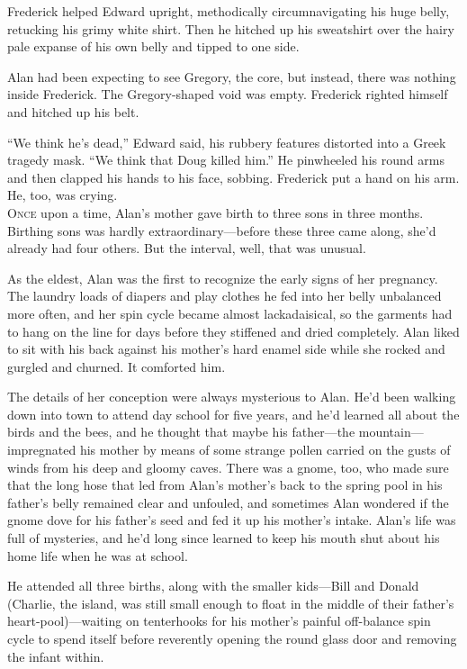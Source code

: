 \documentclass{article}
\begin{document}
Frederick helped Edward upright, methodically circumnavigating his
huge belly, retucking his grimy white shirt.  Then he hitched up his
sweatshirt over the hairy pale expanse of his own belly and tipped to
one side.

Alan had been expecting to see Gregory, the core, but instead, there
was nothing inside Frederick.  The Gregory-shaped void was empty. 
Frederick righted himself and hitched up his belt.

``We think he's dead,'' Edward said, his rubbery features distorted
into a Greek tragedy mask.  ``We think that Doug killed him.'' He
pinwheeled his round arms and then clapped his hands to his face,
sobbing.  Frederick put a hand on his arm.  He, too, was crying.
\\
\lettrine[lines=3, lhang=.5, nindent=0pt, findent=2pt]{O}{nce} upon a time, Alan's mother gave birth to three sons in three
months.  Birthing sons was hardly extraordinary---before these three
came along, she'd already had four others.  But the interval, well,
that was unusual.

As the eldest, Alan was the first to recognize the early signs of her
pregnancy.  The laundry loads of diapers and play clothes he fed into
her belly unbalanced more often, and her spin cycle became almost
lackadaisical, so the garments had to hang on the line for days before
they stiffened and dried completely.  Alan liked to sit with his back
against his mother's hard enamel side while she rocked and gurgled and
churned.  It comforted him.

The details of her conception were always mysterious to Alan.  He'd
been walking down into town to attend day school for five years, and
he'd learned all about the birds and the bees, and he thought that
maybe his father---the mountain---impregnated his mother by means of
some strange pollen carried on the gusts of winds from his deep and
gloomy caves.  There was a gnome, too, who made sure that the long
hose that led from Alan's mother's back to the spring pool in his
father's belly remained clear and unfouled, and sometimes Alan
wondered if the gnome dove for his father's seed and fed it up his
mother's intake.  Alan's life was full of mysteries, and he'd long
since learned to keep his mouth shut about his home life when he was
at school.

He attended all three births, along with the smaller kids---Bill and
Donald (Charlie, the island, was still small enough to float in the
middle of their father's heart-pool)---waiting on tenterhooks for his
mother's painful off-balance spin cycle to spend itself before
reverently opening the round glass door and removing the infant
within.
\end{document}
